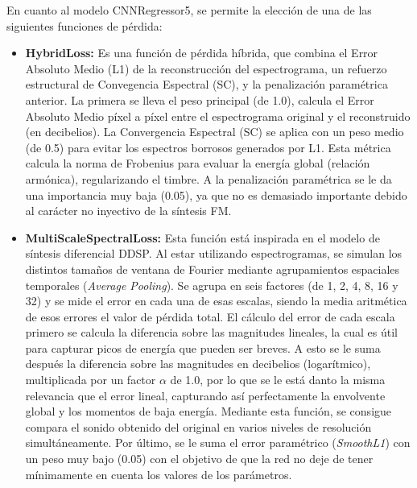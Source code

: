 \begin{itemize}
        En cuanto al modelo CNNRegressor5, se permite la elección de una de las siguientes funciones de pérdida:
    \begin{itemize}
        \item \textbf{HybridLoss: } %
        Es una función de pérdida híbrida, que combina el Error Absoluto Medio (L1) de la reconstrucción del 
        espectrograma, un refuerzo estructural de Convegencia Espectral (SC), y la penalización paramétrica anterior.
        La primera se lleva el peso principal (de 1.0), calcula el Error Absoluto Medio píxel a píxel entre el espectrograma original y el reconstruido (en decibelios).
        La Convergencia Espectral (SC) se aplica con un peso medio (de 0.5) para evitar los espectros borrosos generados por L1. Esta métrica calcula la norma de Frobenius 
        para evaluar la energía global (relación armónica), regularizando el timbre. A la penalización paramétrica se le da una importancia muy baja (0.05), ya que no es demasiado importante
        debido al carácter no inyectivo de la síntesis FM.
          
        \item \textbf{MultiScaleSpectralLoss: } Esta función está inspirada en el modelo de síntesis diferencial DDSP. Al estar utilizando 
        espectrogramas, se simulan los distintos tamaños de ventana de Fourier mediante agrupamientos espaciales temporales (\textit{Average Pooling}).
        Se agrupa en seis factores (de 1, 2, 4, 8, 16 y 32) y se mide el error en cada una de esas escalas, siendo la media aritmética de esos errores
        el valor de pérdida total. El cálculo del error de cada escala primero se calcula la diferencia sobre las magnitudes
        lineales, la cual es útil para capturar picos de energía que pueden ser breves. A esto se le suma después la diferencia sobre las magnitudes en decibelios (logarítmico),
        multiplicada por un factor $\alpha$ de 1.0, por lo que se le está danto la misma relevancia que el error lineal, capturando así perfectamente
        la envolvente global y los momentos de baja energía. Mediante esta función, se consigue compara el sonido obtenido del original
        en varios niveles de resolución simultáneamente. Por último, se le suma el error paramétrico (\textit{SmoothL1}) con un peso muy bajo (0.05) con el objetivo
        de que la red no deje de tener mínimamente en cuenta los valores de los parámetros.   
    \end{itemize}
\end{itemize}
